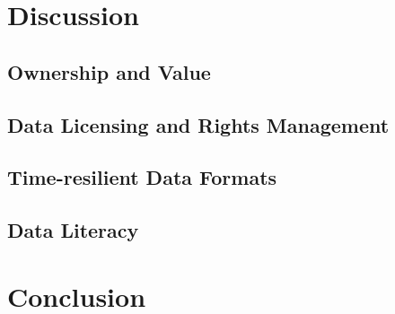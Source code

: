 \documentclass[runningheads,a4paper]{llncs}
\begin{document}
\section{Discussion}

\subsection{Ownership and Value}

\subsection{Data Licensing and Rights Management}

\subsection{Time-resilient Data Formats}

\subsection{Data Literacy}

\section{Conclusion}



\end{document}
